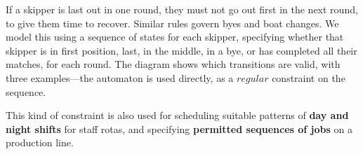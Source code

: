\documentclass[a1paper]{tikzposter}
\begin{document}
{    If a skipper is last out in one round, they must not go out first in the next round, to give
    them time to recover. Similar rules govern byes and boat changes. We model this using a sequence
    of states for each skipper, specifying whether that skipper is in first position, last,
    in the middle, in a bye, or has completed all their matches, for each round. The diagram shows
    which transitions are valid, with three examples---the automaton is used directly, as a
    $\mathit{regular}$ constraint on the sequence.

    \bigskip

    This kind of constraint is also used for scheduling suitable patterns of \textbf{day and night
    shifts} for staff rotas, and specifying \textbf{permitted sequences of jobs} on a production
    line.
}

{
}
\end{document}

